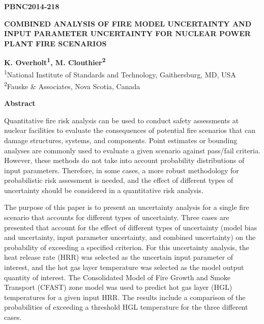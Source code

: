 \documentclass[12pt]{article}
\begin{document}
\begin{flushright}
\textbf{PBNC2014-218}
\end{flushright}

\begin{center}
\textbf{COMBINED ANALYSIS OF FIRE MODEL UNCERTAINTY AND INPUT PARAMETER UNCERTAINTY FOR NUCLEAR POWER PLANT FIRE SCENARIOS}
\end{center}

\begin{center}
\textbf{K. Overholt\textsuperscript{1}, M. Clouthier\textsuperscript{2}}\\
\textsuperscript{1}National Institute of Standards and Technology, Gaithersburg, MD, USA\\
\textsuperscript{2}Fauske \& Associates, Nova Scotia, Canada
\end{center}

\begin{center}
\textbf{Abstract}
\end{center}
 
Quantitative fire risk analysis can be used to conduct safety assessments at nuclear facilities to evaluate the consequences of potential fire scenarios that can damage structures, systems, and components. Point estimates or bounding analyses are commonly used to evaluate a given scenario against pass/fail criteria. However, these methods do not take into account probability distributions of input parameters. Therefore, in some cases, a more robust methodology for probabilistic risk assessment is needed, and the effect of different types of uncertainty should be considered in a quantitative risk analysis.

The purpose of this paper is to present an uncertainty analysis for a single fire scenario that accounts for different types of uncertainty. Three cases are presented that account for the effect of different types of uncertainty (model bias and uncertainty, input parameter uncertainty, and combined uncertainty) on the probability of exceeding a specified criterion. For this uncertainty analysis, the heat release rate (HRR) was selected as the uncertain input parameter of interest, and the hot gas layer temperature was selected as the model output quantity of interest. The Consolidated Model of Fire Growth and Smoke Transport (CFAST) zone model was used to predict hot gas layer (HGL) temperatures for a given input HRR. The results include a comparison of the probabilities of exceeding a threshold HGL temperature for the three different cases.
\end{document}
